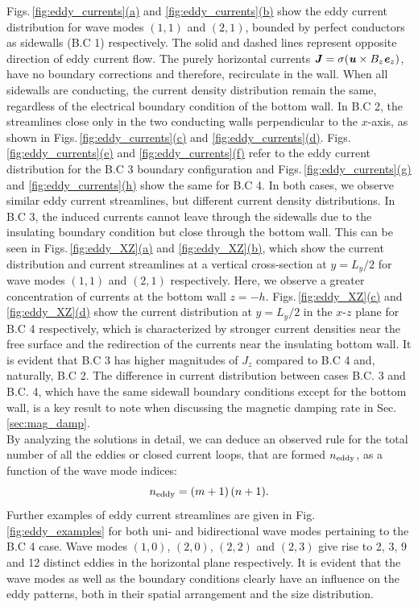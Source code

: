 \documentclass[aps,prfluids,reprint,superscriptaddress]{revtex4-2}
\newcommand{\h}[1]{\textbf{\textit{#1}}}
\newcommand{\subref}[2]{\ref{#1}\hyperref[#1]{(#2)}}
\begin{document}
Figs.\,\ref{fig:eddy_currents}\hyperref[fig:eddy_ab]{(a)} and \ref{fig:eddy_currents}\hyperref[fig:eddy_ab]{(b)} show the eddy current distribution for wave modes $(1,1)$ and $(2,1)$, bounded by perfect conductors as sidewalls (B.C 1) respectively. The solid and dashed lines represent opposite direction of eddy current flow. The purely horizontal currents $\h J=\sigma({\h u}\times B_z\h e_z)$, have no boundary corrections and therefore, recirculate in the wall. When all sidewalls are conducting, the current density distribution remain the same, regardless of the electrical boundary condition of the bottom wall. In B.C 2, the streamlines close only in the two conducting walls perpendicular to the $x$-axis, as shown in Figs.\,\ref{fig:eddy_currents}\hyperref[fig:eddy_ef]{(c)} and \ref{fig:eddy_currents}\hyperref[fig:eddy_ef]{(d)}. Figs.\,\ref{fig:eddy_currents}\hyperref[fig:eddy_cd]{(e)} and \ref{fig:eddy_currents}\hyperref[fig:eddy_cd]{(f)} refer to the eddy current distribution for the B.C 3 boundary configuration and Figs.\,\ref{fig:eddy_currents}\hyperref[fig:eddy_gh]{(g)} and \ref{fig:eddy_currents}\hyperref[fig:eddy_gh]{(h)} show the same for B.C 4. In both cases, we observe similar eddy current streamlines, but different current density distributions. In B.C 3, the induced currents cannot leave through the sidewalls due to the insulating boundary condition but close through the bottom wall. This can be seen in Figs.\,\subref{fig:eddy_XZ}{a} and \subref{fig:eddy_XZ}{b}, which show the current distribution and current streamlines at a vertical cross-section at $y=L_y/2$ for wave modes $(1,1)$ and $(2,1)$ respectively. Here, we observe a greater concentration of currents at the bottom wall $z=-h$. Figs.\,\subref{fig:eddy_XZ}{c} and \subref{fig:eddy_XZ}{d} show the current distribution at $y=L_y/2$ in the $x$-$z$ plane for B.C 4 respectively, which is characterized by stronger current densities near the free surface and the redirection of the currents near the insulating bottom wall. It is evident that B.C 3 has higher magnitudes of $J_z$ compared to B.C 4 and, naturally, B.C 2. The difference in current distribution between cases B.C. 3 and B.C. 4, which have the same sidewall boundary conditions except for the bottom wall, is a key result to note when discussing the magnetic damping rate in Sec.\,\ref{sec:mag_damp}.  
\\
\indent By analyzing the solutions in detail, we can deduce an observed rule for the total number of all the eddies or closed current loops, that are formed $n_{\rm eddy}$, as a function of the wave mode indices:
\begin{equation}
	n_{\rm eddy} = (m+1)\,(n+1).
	\label{eq:no_of_eddies}
\end{equation}     
Further examples of eddy current streamlines are given in Fig.\,\ref{fig:eddy_examples} for both uni- and bidirectional wave modes pertaining to the B.C 4 case. Wave modes $(1,0)$, $(2,0)$, $(2,2)$ and $(2,3)$ give rise to 2, 3, 9 and 12 distinct eddies in the horizontal plane respectively. It is evident that the wave modes as well as the boundary conditions clearly have an influence on the eddy patterns, both in their spatial arrangement and the size distribution. 
 
\end{document}

